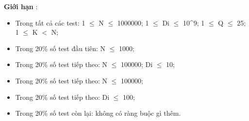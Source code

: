 \textbf{    Giới hạn   }   :  
\begin{itemize}
	\item     Trong tất cả các test: 1  $\le$  N  $\le$  1000000; 1  $\le$  Di  $\le$  10\textasciicircum9; 1  $\le$  Q  $\le$  25; 1  $\le$  K $<$ N;   
	\item     Trong 20\% số test đầu tiên: N  $\le$  1000;   
	\item     Trong 20\% số test tiếp theo: N  $\le$  100000; Di  $\le$  10;   
	\item     Trong 20\% số test tiếp theo: N  $\le$  100000;   
	\item     Trong 20\% số test tiếp theo: Di  $\le$  100;   
	\item     Trong 20\% số test còn lại: không có ràng buộc gì thêm.   
\end{itemize}

